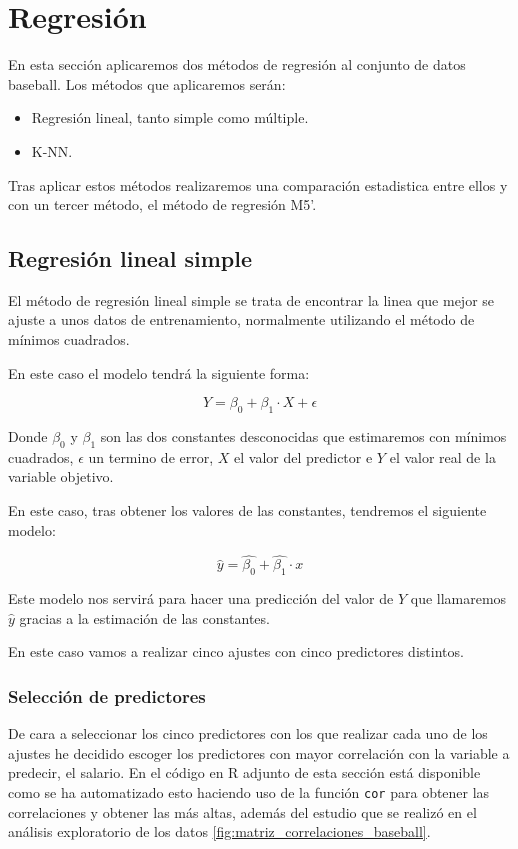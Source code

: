 \section{Regresión}

En esta sección aplicaremos dos métodos de regresión al conjunto de datos baseball. Los métodos que aplicaremos serán:

\begin{itemize}
	\item Regresión lineal, tanto simple como múltiple.
	\item K-NN.
\end{itemize}

Tras aplicar estos métodos realizaremos una comparación estadistica entre ellos y con un tercer método, el método de regresión M5'.

\subsection{Regresión lineal simple}

El método de regresión lineal simple se trata de encontrar la linea que mejor se ajuste a unos datos de entrenamiento, normalmente utilizando el método de mínimos cuadrados.

En este caso el modelo tendrá la siguiente forma:

\[
Y = \beta_0 + \beta_1 \cdot X + \epsilon
\]

Donde $\beta_0$ y $\beta_1$ son las dos constantes desconocidas que estimaremos con mínimos cuadrados, $\epsilon$ un termino de error, $X$ el valor del predictor e $Y$ el valor real de la variable objetivo.

En este caso, tras obtener los valores de las constantes, tendremos el siguiente modelo:

\[
\hat{y} = \hat{\beta_0} + \hat{\beta_1} \cdot x
\]

Este modelo nos servirá para hacer una predicción del valor de $Y$ que llamaremos $\hat{y}$ gracias a la estimación de las constantes.

En este caso vamos a realizar cinco ajustes con cinco predictores distintos.

\subsubsection{Selección de predictores}

De cara a seleccionar los cinco predictores con los que realizar cada uno de los ajustes he decidido escoger los predictores con mayor correlación con la variable a predecir, el salario. En el código en R adjunto de esta sección está disponible como se ha automatizado esto haciendo uso de la función \texttt{cor} para obtener las correlaciones y obtener las más altas, además del estudio que se realizó en el análisis exploratorio de los datos \ref{fig:matriz_correlaciones_baseball}.

